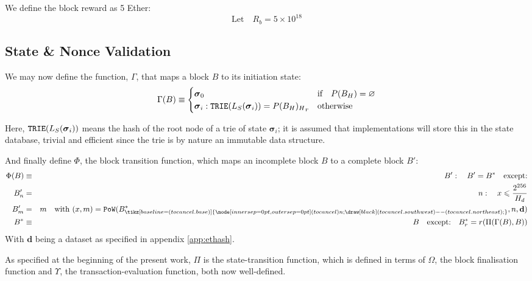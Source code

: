 \documentclass[9pt,oneside]{amsart}
\newcommand{\hcancel}[1]{%
    \tikz[baseline=(tocancel.base)]{
        \node[inner sep=0pt,outer sep=0pt] (tocancel) {#1};
        \draw[black] (tocancel.south west) -- (tocancel.north east);
    }%
}%
\begin{document}
\begin{multicols}{2}
We define the block reward as 5 Ether:
\begin{equation}
\text{Let} \quad R_b = 5 \times 10^{18}
\end{equation}

\subsection{State \& Nonce Validation}\label{sec:statenoncevalidation}

We may now define the function, $\Gamma$, that maps a block $B$ to its initiation state:
\begin{equation}
\Gamma(B) \equiv \begin{cases}
\boldsymbol{\sigma}_0 & \text{if} \quad P(B_H) = \varnothing \\
\boldsymbol{\sigma}_i: \mathtt{\small TRIE}(L_S(\boldsymbol{\sigma}_i)) = {P(B_H)_H}_r & \text{otherwise}
\end{cases}
\end{equation}

Here, $\mathtt{\small TRIE}(L_S(\boldsymbol{\sigma}_i))$ means the hash of the root node of a trie of state $\boldsymbol{\sigma}_i$; it is assumed that implementations will store this in the state database, trivial and efficient since the trie is by nature an immutable data structure.

And finally define $\Phi$, the block transition function, which maps an incomplete block $B$ to a complete block $B'$:
\begin{eqnarray}
\Phi(B) & \equiv & B': \quad B' = B^* \quad \text{except:} \\
B'_n & = & n: \quad x \leqslant \frac{2^{256}}{H_d} \\
B'_m & = & m \quad \text{with } (x, m) = \mathtt{PoW}(B^*_{\hcancel{n}}, n, \mathbf{d}) \\
B^* & \equiv & B \quad \text{except:} \quad B^*_r = r(\Pi(\Gamma(B), B))
\end{eqnarray}
With $\mathbf{d}$ being a dataset as specified in appendix \ref{app:ethash}.

As specified at the beginning of the present work, $\Pi$ is the state-transition function, which is defined in terms of $\Omega$, the block finalisation function and $\Upsilon$, the transaction-evaluation function, both now well-defined.


\end{multicols}
\end{document}
